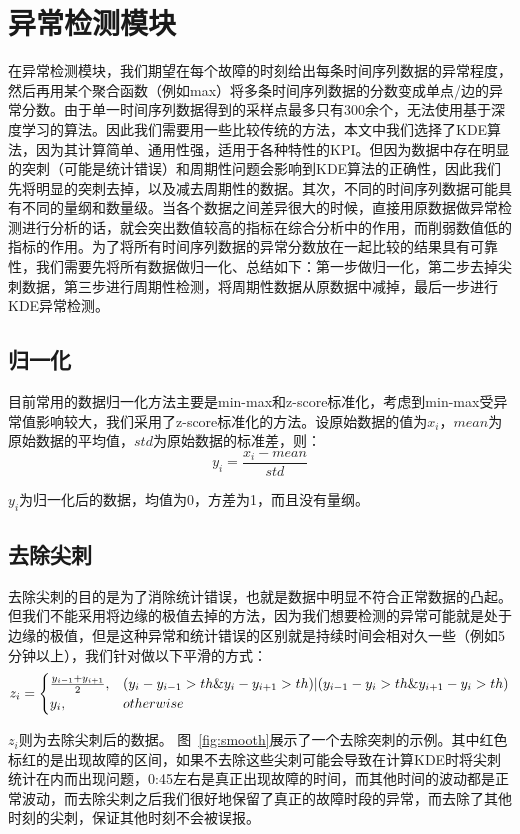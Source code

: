 \section{异常检测模块}
在异常检测模块，我们期望在每个故障的时刻给出每条时间序列数据的异常程度，然后再用某个聚合函数（例如max）将多条时间序列数据的分数变成单点/边的异常分数。由于单一时间序列数据得到的采样点最多只有300余个，无法使用基于深度学习的算法。因此我们需要用一些比较传统的方法，本文中我们选择了KDE算法，因为其计算简单、通用性强，适用于各种特性的KPI。但因为数据中存在明显的突刺（可能是统计错误）和周期性问题会影响到KDE算法的正确性，因此我们先将明显的突刺去掉，以及减去周期性的数据。其次，不同的时间序列数据可能具有不同的量纲和数量级。当各个数据之间差异很大的时候，直接用原数据做异常检测进行分析的话，就会突出数值较高的指标在综合分析中的作用，而削弱数值低的指标的作用。为了将所有时间序列数据的异常分数放在一起比较的结果具有可靠性，我们需要先将所有数据做归一化、总结如下：第一步做归一化，第二步去掉尖刺数据，第三步进行周期性检测，将周期性数据从原数据中减掉，最后一步进行KDE异常检测。
\subsection{归一化}
目前常用的数据归一化方法主要是min-max和z-score标准化，考虑到min-max受异常值影响较大，我们采用了z-score标准化的方法。设原始数据的值为$x_i$，$mean$为原始数据的平均值，$std$为原始数据的标准差，则：
\begin{equation}
y_i = \frac{x_i-mean}{std}
\end{equation}

$y_i$为归一化后的数据，均值为0，方差为1，而且没有量纲。
\subsection{去除尖刺}
去除尖刺的目的是为了消除统计错误，也就是数据中明显不符合正常数据的凸起。但我们不能采用将边缘的极值去掉的方法，因为我们想要检测的异常可能就是处于边缘的极值，但是这种异常和统计错误的区别就是持续时间会相对久一些（例如5分钟以上），我们针对做以下平滑的方式：
\begin{equation}
z_i = \begin{cases} \frac{y_{i-1} + y_{i+1}}{2}, & (y_i - y_{i-1} > th \& y_i - y_{i+1} > th) | (y_{i-1} - y_i > th \& y_{i+1} - y_i > th) \cr y_i, & otherwise  \end{cases}
\end{equation}

$z_i$则为去除尖刺后的数据。
图~\ref{fig:smooth}展示了一个去除突刺的示例。其中红色标红的是出现故障的区间，如果不去除这些尖刺可能会导致在计算KDE时将尖刺统计在内而出现问题，0:45左右是真正出现故障的时间，而其他时间的波动都是正常波动，而去除尖刺之后我们很好地保留了真正的故障时段的异常，而去除了其他时刻的尖刺，保证其他时刻不会被误报。

